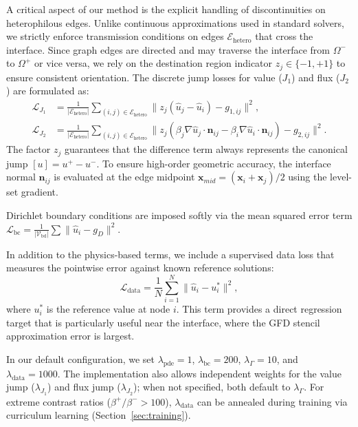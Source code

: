 \documentclass[11pt]{article}
\theoremstyle{definition}
\theoremstyle{remark}
\theoremstyle{plain}
\begin{document}
A critical aspect of our method is the explicit handling of discontinuities on heterophilous edges. Unlike continuous approximations used in standard solvers, we strictly enforce transmission conditions on edges $\mathcal{E}_{\text{hetero}}$ that cross the interface. Since graph edges are directed and may traverse the interface from $\Omega^-$ to $\Omega^+$ or vice versa, we rely on the destination region indicator $z_j \in \{-1, +1\}$ to ensure consistent orientation. The discrete jump losses for value ($J_1$) and flux ($J_2$) are formulated as:
\begin{align}
    \mathcal{L}_{J_1} &= \frac{1}{|\mathcal{E}_{\text{hetero}}|} \sum_{(i,j) \in \mathcal{E}_{\text{hetero}}} \| z_j (\hat{u}_j - \hat{u}_i) - g_{1,ij} \|^2, \\
    \mathcal{L}_{J_2} &= \frac{1}{|\mathcal{E}_{\text{hetero}}|} \sum_{(i,j) \in \mathcal{E}_{\text{hetero}}} \| z_j (\beta_j \nabla \hat{u}_j \cdot \mathbf{n}_{ij} - \beta_i \nabla \hat{u}_i \cdot \mathbf{n}_{ij}) - g_{2,ij} \|^2.
\end{align}
The factor $z_j$ guarantees that the difference term always represents the canonical jump $[u] = u^+ - u^-$. To ensure high-order geometric accuracy, the interface normal $\mathbf{n}_{ij}$ is evaluated at the edge midpoint $\mathbf{x}_{mid} = (\mathbf{x}_i + \mathbf{x}_j)/2$ using the level-set gradient.

Dirichlet boundary conditions are imposed softly via the mean squared error term $\mathcal{L}_{\text{bc}} = \frac{1}{|\mathcal{V}_{\text{bd}}|} \sum \| \hat{u}_i - g_D \|^2$.

In addition to the physics-based terms, we include a supervised data loss that measures the pointwise error against known reference solutions:
\begin{equation}
    \mathcal{L}_{\text{data}} = \frac{1}{N} \sum_{i=1}^{N} \| \hat{u}_i - u_i^* \|^2,
\end{equation}
where $u_i^*$ is the reference value at node $i$. This term provides a direct regression target that is particularly useful near the interface, where the GFD stencil approximation error is largest.

In our default configuration, we set $\lambda_{\text{pde}} = 1$, $\lambda_{\text{bc}} = 200$, $\lambda_{\Gamma} = 10$, and $\lambda_{\text{data}} = 1000$. The implementation also allows independent weights for the value jump ($\lambda_{J_1}$) and flux jump ($\lambda_{J_2}$); when not specified, both default to $\lambda_{\Gamma}$. For extreme contrast ratios ($\beta^+/\beta^- > 100$), $\lambda_{\text{data}}$ can be annealed during training via curriculum learning (Section~\ref{sec:training}).
\end{document}

